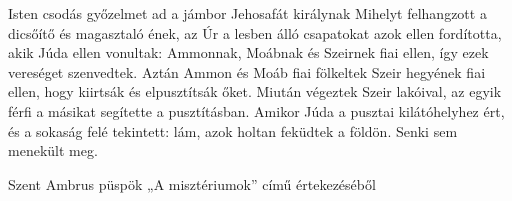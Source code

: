 \documentclass[twoside]{article}
\begin{document}
\begin{lectio}{Isten csodás győzelmet ad a jámbor Jehosafát királynak}
Mihelyt felhangzott a dicsőítő és magasztaló ének, az Úr a lesben álló csapatokat azok ellen fordította, akik Júda ellen vonultak: Ammonnak, Moábnak és Szeirnek fiai ellen, így ezek vereséget szenvedtek. Aztán Ammon és Moáb fiai fölkeltek Szeir hegyének fiai ellen, hogy kiirtsák és elpusztítsák őket. Miután végeztek Szeir lakóival, az egyik férfi a másikat segítette a pusztításban. Amikor Júda a pusztai kilátóhelyhez ért, és a sokaság felé tekintett: lám, azok holtan feküdtek a földön. Senki sem menekült meg.
\end{lectio}



Szent Ambrus püspök „A misztériumok” című értekezéséből

{\centering{}}
\end{document}
